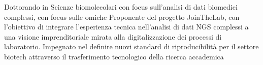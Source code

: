 \documentclass{resume} %
\begin{document}
\begin{rSection}{}
   Dottorando in Scienze biomolecolari con focus sull'analisi di dati biomedici complessi, con focus sulle omiche
   Proponente del progetto JoinTheLab, con l’obiettivo di integrare l'esperienza tecnica nell'analisi di dati NGS complessi a una visione imprenditoriale mirata alla digitalizzazione dei processi di laboratorio.
   Impegnato nel definire nuovi standard di riproducibilità per il settore biotech attraverso il trasferimento tecnologico della ricerca accademica
\end{rSection}




\end{document}
